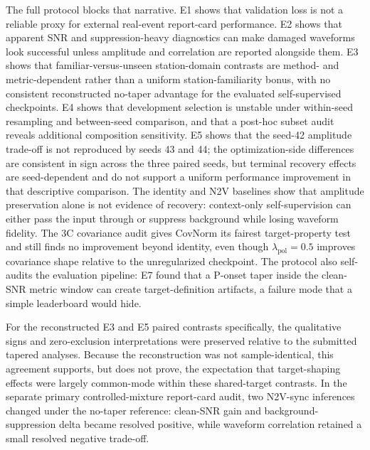 \documentclass[review,12pt,authoryear]{elsarticle}
\newcommand{\lpol}{\lambda_{\mathrm{pol}}}
\begin{document}
The full protocol blocks that narrative. E1 shows that validation loss is not a reliable proxy for external real-event report-card performance. E2 shows that apparent SNR and suppression-heavy diagnostics can make damaged waveforms look successful unless amplitude and correlation are reported alongside them. E3 shows that familiar-versus-unseen station-domain contrasts are method- and metric-dependent rather than a uniform station-familiarity bonus, with no consistent reconstructed no-taper advantage for the evaluated self-supervised checkpoints. E4 shows that development selection is unstable under within-seed resampling and between-seed comparison, and that a post-hoc subset audit reveals additional composition sensitivity. E5 shows that the seed-42 amplitude trade-off is not reproduced by seeds 43 and 44; the optimization-side differences are consistent in sign across the three paired seeds, but terminal recovery effects are seed-dependent and do not support a uniform performance improvement in that descriptive comparison. The identity and N2V baselines show that amplitude preservation alone is not evidence of recovery: context-only self-supervision can either pass the input through or suppress background while losing waveform fidelity. The 3C covariance audit gives CovNorm its fairest target-property test and still finds no improvement beyond identity, even though $\lpol=0.5$ improves covariance shape relative to the unregularized checkpoint. The protocol also self-audits the evaluation pipeline: E7 found that a P-onset taper inside the clean-SNR metric window can create target-definition artifacts, a failure mode that a simple leaderboard would hide.

For the reconstructed E3 and E5 paired contrasts specifically, the qualitative signs and zero-exclusion interpretations were preserved relative to the submitted tapered analyses. Because the reconstruction was not sample-identical, this agreement supports, but does not prove, the expectation that target-shaping effects were largely common-mode within these shared-target contrasts. In the separate primary controlled-mixture report-card audit, two N2V-sync inferences changed under the no-taper reference: clean-SNR gain and background-suppression delta became resolved positive, while waveform correlation retained a small resolved negative trade-off.
\end{document}
